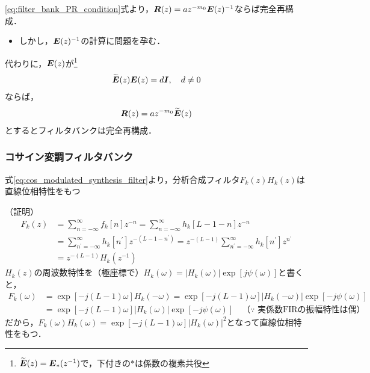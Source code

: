 \documentclass[14pt,xcolor=dvipsnames,table,dvipdfmx]{beamer}
\begin{document}
\begin{frame}[c]
    \frametitle{}
    \eqref{eq:filter_bank_PR_condition}式より，$\boldsymbol{R}(z) = a z^{-m_{0}} \boldsymbol{E}(z)^{-1}$ならば完全再構成．
    \begin{itemize}
        \item しかし，$\boldsymbol{E}(z)^{-1}$の計算に問題を孕む．
    \end{itemize}
    代わりに，$\boldsymbol{E}(z)$が\footnote{$\widetilde{\boldsymbol{E}}(z) = \boldsymbol{E}_{\ast}(z^{-1})$で，下付きの$\ast$は係数の複素共役}
    \begin{align}
        \widetilde{\boldsymbol{E}}(z) \boldsymbol{E}(z) = d \boldsymbol{I}, \quad d \neq 0
    \end{align}
    ならば，
    \begin{align*}
        \boldsymbol{R}(z) = a z^{-m_{0}} \widetilde{\boldsymbol{E}}(z)
    \end{align*}
    とするとフィルタバンクは完全再構成．
\end{frame}

\begin{frame}[c]
    \frametitle{コサイン変調フィルタバンク}
    \begin{block}{}
        式\eqref{eq:cos_modulated_synthesis_filter}より，分析合成フィルタ$F_{k}(z)H_{k}(z)$は直線位相特性をもつ
    \end{block}
    \scriptsize
    （証明）
    \begin{align*}
        F_{k}(z) &= \sum_{n = -\infty}^{\infty} f_{k}[n] z^{-n} = \sum_{n = -\infty}^{\infty} h_{k}[L - 1 - n] z^{-n} \\
        &= \sum_{n^{\prime} = -\infty}^{\infty} h_{k}[n^{\prime}] z^{-(L - 1 - n^{\prime})} = z^{-(L-1)} \sum_{n^{\prime} = -\infty}^{\infty} h_{k}[n^{\prime}] z^{n^{\prime}} \\
        &= z^{-(L-1)} H_{k}(z^{-1})
    \end{align*}
    $H_{k}(z)$の周波数特性を（極座標で）$H_{k}(\omega) = |H_{k}(\omega)| \exp[j \psi(\omega)]$と書くと，
    \begin{align*}
        F_{k}(\omega) &= \exp[-j(L - 1)\omega] H_{k}(-\omega) = \exp[-j(L - 1)\omega] |H_{k}(-\omega)| \exp[-j \psi(\omega)] \\
        &= \exp[-j(L - 1)\omega] |H_{k}(\omega)| \exp[-j \psi(\omega)] \quad \text{（$\because$ 実係数FIRの振幅特性は偶）}
    \end{align*}
    だから，$F_{k}(\omega) H_{k}(\omega) = \exp[-j(L - 1)\omega] |H_{k}(\omega)|^{2}$となって直線位相特性をもつ．
\end{frame}
\end{document}
